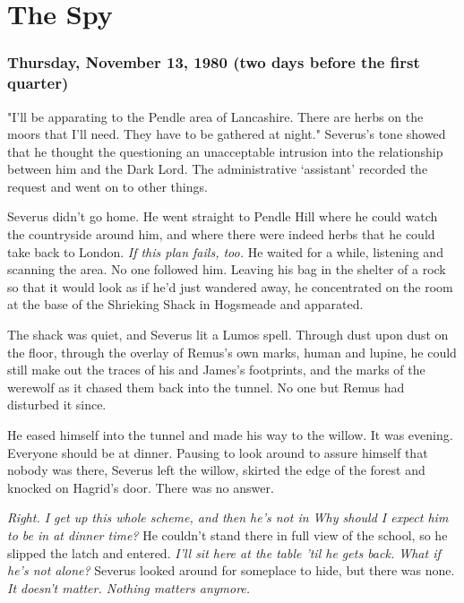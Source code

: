 
\chapter{The Spy}

\subsection{Thursday, November 13, 1980 (two days before the first quarter)}

"I'll be apparating to the Pendle area of Lancashire. There are herbs on the moors that I'll need. They have to be gathered at night." Severus's tone showed that he thought the questioning an unacceptable intrusion into the relationship between him and the Dark Lord. The administrative `assistant' recorded the request and went on to other things.

Severus didn't go home. He went straight to Pendle Hill where he could watch the countryside around him, and where there were indeed herbs that he could take back to London. \emph{If this plan fails, too.} He waited for a while, listening and scanning the area. No one followed him. Leaving his bag in the shelter of a rock so that it would look as if he'd just wandered away, he concentrated on the room at the base of the Shrieking Shack in Hogsmeade and apparated.

The shack was quiet, and Severus lit a Lumos spell. Through dust upon dust on the floor, through the overlay of Remus's own marks, human and lupine, he could still make out the traces of his and James's footprints, and the marks of the werewolf as it chased them back into the tunnel. No one but Remus had disturbed it since.

He eased himself into the tunnel and made his way to the willow. It was evening. Everyone should be at dinner. Pausing to look around to assure himself that nobody was there, Severus left the willow, skirted the edge of the forest and knocked on Hagrid's door. There was no answer.

\emph{Right. I get up this whole scheme, and then he's not in{\el} Why should I expect him to be in at dinner time?} He couldn't stand there in full view of the school, so he slipped the latch and entered. \emph{I'll sit here at the table 'til he gets back. What if he's not alone?} Severus looked around for someplace to hide, but there was none. \emph{It doesn't matter. Nothing matters anymore.}

